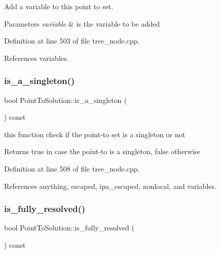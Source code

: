 Add a variable to this point to set. 


\begin{DoxyParams}{Parameters}
{\em variable} & is the variable to be added \\
\hline
\end{DoxyParams}


Definition at line 503 of file tree\+\_\+node.\+cpp.



References variables.

\mbox{\label{structPointToSolution_a20d57034a0bbf4ff2bca253263f40de1}} 
\subsubsection{\texorpdfstring{is\+\_\+a\+\_\+singleton()}{is\_a\_singleton()}}
{\footnotesize\ttfamily bool Point\+To\+Solution\+::is\+\_\+a\+\_\+singleton (\begin{DoxyParamCaption}{ }\end{DoxyParamCaption}) const}



this function check if the point-\/to set is a singleton or not 

\begin{DoxyReturn}{Returns}
true in case the point-\/to is a singleton, false otherwise 
\end{DoxyReturn}


Definition at line 508 of file tree\+\_\+node.\+cpp.



References anything, escaped, ipa\+\_\+escaped, nonlocal, and variables.

\mbox{\label{structPointToSolution_a2c0a68c76431841d20f59bd6f7a59ee2}} 
\subsubsection{\texorpdfstring{is\+\_\+fully\+\_\+resolved()}{is\_fully\_resolved()}}
{\footnotesize\ttfamily bool Point\+To\+Solution\+::is\+\_\+fully\+\_\+resolved (\begin{DoxyParamCaption}{ }\end{DoxyParamCaption}) const}



